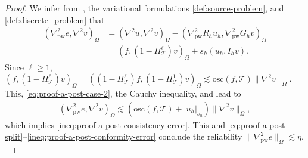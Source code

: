\documentclass[a4paper]{amsart}
\numberwithin{equation}{section}
\def\F{\mathcal{F}}
\def\T{\mathcal{T}}
\def\pw{\mathrm{pw}}
\theoremstyle{definition}
\theoremstyle{remark}
\numberwithin{theorem}{section}
\numberwithin{equation}{section}
\numberwithin{table}{section}
\numberwithin{figure}{section}
\begin{document}
\begin{proof}
We infer from , the variational formulations \eqref{def:source-problem}, and \eqref{def:discrete_problem} that
\begin{align}\label{eq:proof-a-post-case-2}
	(\nabla_\pw^2 e, \nabla^2 v)_\Omega &= (\nabla^2 u, \nabla^2 v)_\Omega - (\nabla_\pw^2 R_h u_h, \nabla_\pw^2 G_h v)_\Omega\nonumber\\
	&= (f, (1 - \Pi_\T^\ell) v)_\Omega + s_h(u_h, I_h v).
\end{align}
Since $\ell \geq 1$, $(f, (1 - \Pi_\T^\ell) v)_\Omega = ((1 - \Pi_\T^\ell) f,  (1 - \Pi_\T^1) v)_\Omega \lesssim \mathrm{osc}(f,\T)\|\nabla^2 v\|_\Omega$. This, \eqref{eq:proof-a-post-case-2}, the Cauchy inequality, and  lead to
\begin{align*}
	(\nabla_\pw^2 e, \nabla^2 v)_\Omega \lesssim (\mathrm{osc}(f,\T) + |u_h|_{s_h})\|\nabla^2 v\|_\Omega,
\end{align*}
which implies \eqref{ineq:proof-a-post-consistency-error}.
This and \eqref{eq:proof-a-post-split}--\eqref{ineq:proof-a-post-conformity-error} conclude the reliability $\|\nabla_\pw^2 e\|_\Omega \lesssim \eta$.\\[-0.5em]


\end{proof}
\end{document}
